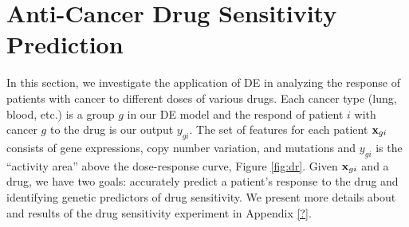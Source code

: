 \section{Anti-Cancer Drug Sensitivity Prediction}
\label{realexp}
In this section, we investigate the application of DE in analyzing the response of patients with cancer to different doses of various drugs. 
Each cancer type (lung, blood, etc.) is a group $g$ in our DE model and the respond of patient $i$ with cancer $g$ to the drug is our output $y_{gi}$. 
The set of features for each patient $\mathbf{x}_{gi}$ consists of gene expressions, copy number variation, and mutations and $y_{gi}$ is the ``activity area'' above the dose-response curve, Figure \ref{fig:dr}.
Given $\mathbf{x}_{gi}$ and a drug, we have two goals: accurately predict a patient's response to the drug and identifying genetic predictors of drug sensitivity. 
We present more details about and results of the drug sensitivity experiment in Appendix \ref{?}.
%

